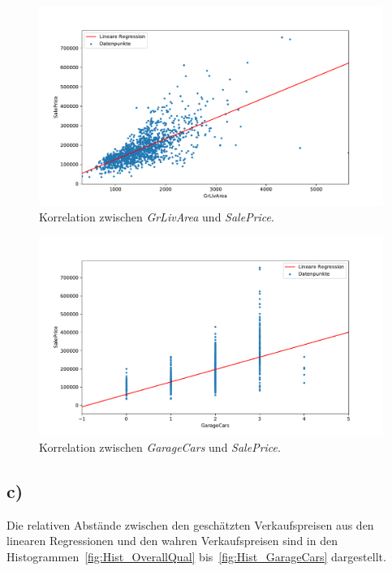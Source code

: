 \documentclass[a4paper, 11pt]{article}
\begin{document}
\begin{figure}
    \centering
    \includegraphics[width=\textwidth]{../A28abc/Scatter_GrLivArea.pdf}
    \caption{Korrelation zwischen \textit{GrLivArea} und \textit{SalePrice}.}
    \label{fig:Scatter_GrLivArea}
\end{figure}
\begin{figure}
    \centering
    \includegraphics[width=\textwidth]{../A28abc/Scatter_GarageCars.pdf}
    \caption{Korrelation zwischen \textit{GarageCars} und \textit{SalePrice}.}
    \label{fig:Scatter_GarageCars}
\end{figure}
\FloatBarrier

\subsection{c)}
Die relativen Abstände zwischen den geschätzten Verkaufspreisen aus den
linearen Regressionen und den wahren Verkaufspreisen sind in den
Histogrammen~\ref{fig:Hist_OverallQual} bis~\ref{fig:Hist_GarageCars}
dargestellt.
\end{document}
